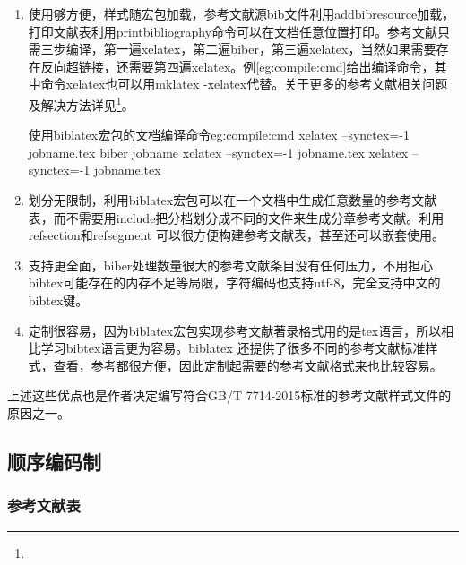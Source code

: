 \begin{enumerate}
\item 使用够方便，样式随宏包加载，参考文献源bib文件利用addbibresource加载，打印文献表利用printbibliography命令可以在文档任意位置打印。参考文献只需三步编译，第一遍xelatex，第二遍biber，第三遍xelatex，当然如果需要存在反向超链接，还需要第四遍xelatex。例\ref{eg:compile:cmd}给出编译命令，其中命令xelatex也可以用mklatex -xelatex代替。关于更多的参考文献相关问题及解决方法详见\footnote{}。

\begin{codetex}{使用biblatex宏包的文档编译命令}{eg:compile:cmd}
xelatex --synctex=-1 jobname.tex
biber jobname
xelatex --synctex=-1 jobname.tex
xelatex --synctex=-1 jobname.tex
\end{codetex}

\item 划分无限制，利用biblatex宏包可以在一个文档中生成任意数量的参考文献表，而不需要用include把分档划分成不同的文件来生成分章参考文献。利用refsection和refsegment 可以很方便构建参考文献表，甚至还可以嵌套使用。

\item 支持更全面，biber处理数量很大的参考文献条目没有任何压力，不用担心bibtex可能存在的内存不足等局限，字符编码也支持utf-8，完全支持中文的bibtex键。

\item 定制很容易，因为biblatex宏包实现参考文献著录格式用的是tex语言，所以相比学习bibtex语言更为容易。biblatex 还提供了很多不同的参考文献标准样式，查看，参考都很方便，因此定制起需要的参考文献格式来也比较容易。
\end{enumerate}

上述这些优点也是作者决定编写符合GB/T 7714-2015标准的参考文献样式文件的原因之一。

\subsection{顺序编码制}

\subsubsection{参考文献表}

